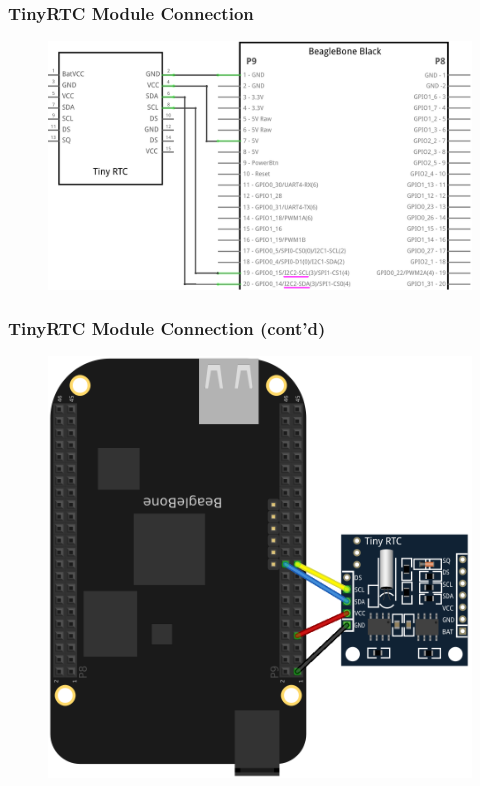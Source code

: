 \begin{frame}
  \frametitle{TinyRTC Module Connection}
  \begin{figure}
    \centering
    \includegraphics[scale=1]{images/bbb-rtc_schem.png}
  \end{figure}
  \vspace*{-12mm}
\end{frame}

\begin{frame}
  \frametitle{TinyRTC Module Connection (cont'd)}
  \begin{figure}
    \centering
    \includegraphics[scale=0.7]{images/bbb-rtc_bb.png}
  \end{figure}
  \vspace*{-12mm}
\end{frame}

